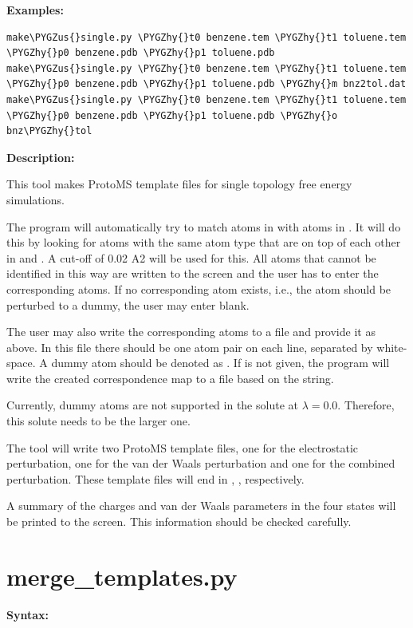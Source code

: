 \documentclass[letterpaper,10pt,english]{sphinxmanual}
\def\PYGZus{\char`\_}
\def\PYGZhy{\char`\-}
\begin{document}
\textbf{Examples:}

\begin{Verbatim}[commandchars=\\\{\}]
make\PYGZus{}single.py \PYGZhy{}t0 benzene.tem \PYGZhy{}t1 toluene.tem \PYGZhy{}p0 benzene.pdb \PYGZhy{}p1 toluene.pdb
make\PYGZus{}single.py \PYGZhy{}t0 benzene.tem \PYGZhy{}t1 toluene.tem \PYGZhy{}p0 benzene.pdb \PYGZhy{}p1 toluene.pdb \PYGZhy{}m bnz2tol.dat
make\PYGZus{}single.py \PYGZhy{}t0 benzene.tem \PYGZhy{}t1 toluene.tem \PYGZhy{}p0 benzene.pdb \PYGZhy{}p1 toluene.pdb \PYGZhy{}o bnz\PYGZhy{}tol
\end{Verbatim}

\textbf{Description:}

This tool makes ProtoMS template files for single topology free energy simulations.

The program will automatically try to match atoms in  with atoms in . It will do this by looking for atoms with the same atom type that are on top of each other in  and . A cut-off of 0.02 A2 will be used for this. All atoms that cannot be identified in this way are written to the screen and the user has to enter the corresponding atoms. If no corresponding atom exists, i.e., the atom should be perturbed to a dummy, the user may enter blank.

The user may also write the corresponding atoms to a file and provide it as  above. In this file there should be one atom pair on each line, separated by white-space. A dummy atom should be denoted as . If  is not given, the program will write the created correspondence map to a file based on the  string.

Currently, dummy atoms are not supported in the solute at \(\lambda=0.0\). Therefore, this solute needs to be the larger one.

The tool will write two ProtoMS template files, one for the electrostatic perturbation, one for the van der Waals perturbation and one for the combined perturbation. These template files will end in , ,  respectively.

A summary of the charges and van der Waals parameters in the four states will be printed to the screen. This information should be checked carefully.


\section{merge\_templates.py}
\label{tools:merge-templates-py}
\textbf{Syntax:}
\end{document}
